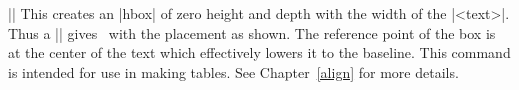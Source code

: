 \mbr
\ext||
\nbr
This creates an |hbox| of zero height and depth with the width of the
|<text>|.  Thus a
|| gives \  with the
placement as shown. The reference point of the box is at the center of the
text which effectively lowers it to the baseline. 
This command is intended for use in making tables. See 
Chapter~{\ref{align}} for more details.

\endblockmode

\ejectpage
\done
  